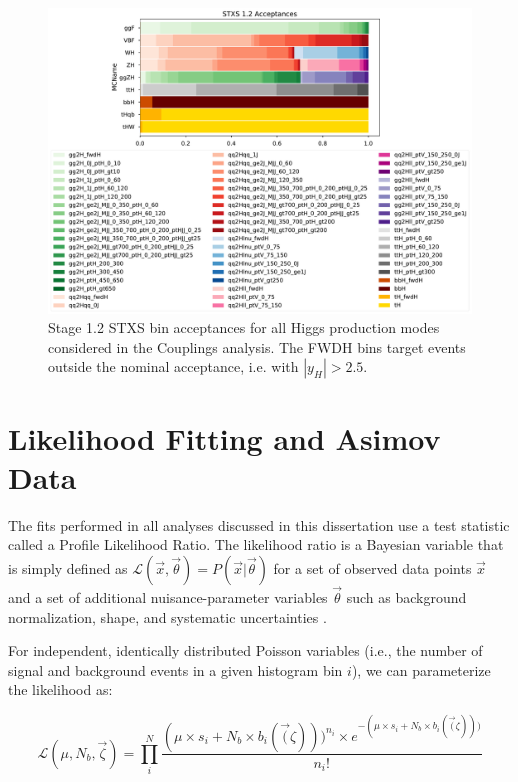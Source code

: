 \begin{figure}[tbp]
        \centering
        \includegraphics[width=\linewidth]{figures/theory_chapter/STXS_acceptances.pdf}
        \caption{Stage 1.2 STXS bin acceptances for all Higgs production modes considered in the Couplings analysis. The FWDH bins target events outside the nominal acceptance, i.e. with $|y_{H}|>2.5$.}
        \label{fig:STXS_acceptances}
\end{figure}

\section{Likelihood Fitting and Asimov Data} \label{sec:likelihoodfit} 

The fits performed in all analyses discussed in this dissertation use a test statistic called a Profile Likelihood Ratio. The likelihood ratio  is a Bayesian variable that is simply defined as $\mathcal{L}(\vec{x},\vec{\theta}) = P(\vec{x} | \vec{\theta})$  for a set of observed data points $\vec{x}$ and a set of additional nuisance-parameter variables $\vec{\theta}$ such as background normalization, shape, and systematic uncertainties \cite{Cowan}.

For independent, identically distributed Poisson variables (i.e., the number of signal and background events in a given histogram bin $i$), we can parameterize the likelihood as:

\begin{equation}
\mathcal{L}(\mu, N_{b}, \vec{\zeta}) = \prod_{i}^{N}{\frac{(\mu \times s_{i}+ N_{b} \times b_{i}(\vec(\zeta)))^{n_{i}} \times e^{-(\mu \times s_{i}+ N_{b} \times b_{i}(\vec(\zeta))) }}{n_{i}!}}
\end{equation}

